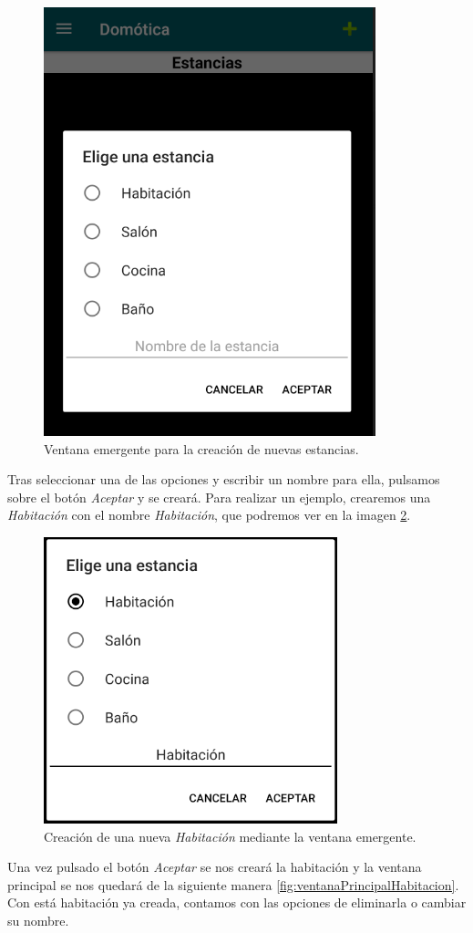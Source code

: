 \begin{figure}[h!]
	\centering
	\includegraphics[width=0.4\linewidth]{img/opcionesEstancias}
	\caption{Ventana emergente para la creación de nuevas estancias.}
	\label{fig:opcionesEstancias}
\end{figure}

Tras seleccionar una de las opciones y escribir un nombre para ella, pulsamos sobre el botón \textit{Aceptar} y se creará. Para realizar un ejemplo, crearemos una \textit{Habitación} con el nombre \textit{Habitación}, que podremos ver en la imagen \ref{fig:creacionHabitacion}. \\

\begin{figure}[h!]
	\centering
	\includegraphics[width=0.5\linewidth]{img/creacionHabitacion}
	\caption{Creación de una nueva \textit{Habitación} mediante la ventana emergente.}
	\label{fig:creacionHabitacion}
\end{figure}

Una vez pulsado el botón \textit{Aceptar} se nos creará la habitación y la ventana principal se nos quedará de la siguiente manera \ref{fig:ventanaPrincipalHabitacion}.\\
Con está habitación ya creada, contamos con las opciones de eliminarla o cambiar su nombre.

